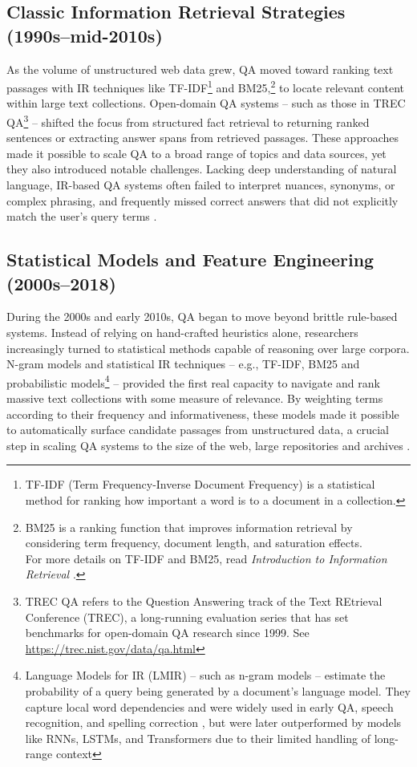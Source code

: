 \begin{spacing}{1.5}
\subsection{Classic Information Retrieval Strategies (1990s--mid-2010s)}
As the volume of unstructured web data grew, QA moved toward ranking text passages with IR techniques like TF-IDF\footnote{TF-IDF (Term Frequency-Inverse Document Frequency) is a statistical method for ranking how important a word is to a document in a collection.} and BM25,\footnote{BM25 is a ranking function that improves information retrieval by considering term frequency, document length, and saturation effects.\\For more details on TF-IDF and BM25, read \textit{Introduction to Information Retrieval} \citep{manning_introduction_2008}.} to locate relevant content within large text collections. Open-domain QA systems -- such as those in TREC QA\footnote{TREC QA refers to the Question Answering track of the Text REtrieval Conference (TREC), a long-running evaluation series that has set benchmarks for open-domain QA research since 1999. See \url{https://trec.nist.gov/data/qa.html}} \citep{hirschman_natural_2001} -- shifted the focus from structured fact retrieval to returning ranked sentences or extracting answer spans from retrieved passages. These approaches made it possible to scale QA to a broad range of topics and data sources, yet they also introduced notable challenges. Lacking deep understanding of natural language, IR-based QA systems often failed to interpret nuances, synonyms, or complex phrasing, and frequently missed correct answers that did not explicitly match the user’s query terms \citep{antoniou_survey_2022, caballero_brief_2021}.

\subsection{Statistical Models and Feature Engineering (2000s--2018)}
During the 2000s and early 2010s, QA began to move beyond brittle rule-based systems. Instead of relying on hand-crafted heuristics alone, researchers increasingly turned to statistical methods capable of reasoning over large corpora. N-gram models and statistical IR techniques -- e.g., TF-IDF, BM25 and probabilistic models\footnote{Language Models for IR (LMIR) -- such as n-gram models -- estimate the probability of a query being generated by a document's language model. They capture local word dependencies and were widely used in early QA, speech recognition, and spelling correction \citep{ponte_language_1998}, but were later outperformed by models like RNNs, LSTMs, and Transformers due to their limited handling of long-range context} -- provided the first real capacity to navigate and rank massive text collections with some measure of relevance. By weighting terms according to their frequency and informativeness, these models made it possible to automatically surface candidate passages from unstructured data, a crucial step in scaling QA systems to the size of the web, large repositories and archives \citep{manning_introduction_2008}.


\end{spacing}
